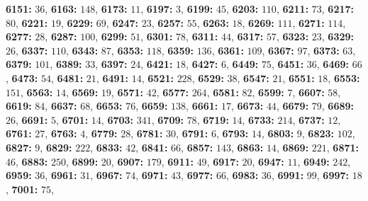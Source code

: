 \textsf{\bfseries 6151:} $36$, \textsf{\bfseries 6163:} $148$, \textsf{\bfseries 6173:} $11$, \textsf{\bfseries 6197:} $3$, \textsf{\bfseries 6199:} $45$, \textsf{\bfseries 6203:} $110$, \textsf{\bfseries 6211:} $73$, \textsf{\bfseries 6217:} $80$, \textsf{\bfseries 6221:} $19$, \textsf{\bfseries 6229:} $69$, \textsf{\bfseries 6247:} $23$, \textsf{\bfseries 6257:} $55$, \textsf{\bfseries 6263:} $18$, \textsf{\bfseries 6269:} $111$, \textsf{\bfseries 6271:} $114$, \textsf{\bfseries 6277:} $28$, \textsf{\bfseries 6287:} $100$, \textsf{\bfseries 6299:} $51$, \textsf{\bfseries 6301:} $78$, \textsf{\bfseries 6311:} $44$, \textsf{\bfseries 6317:} $57$, \textsf{\bfseries 6323:} $23$, \textsf{\bfseries 6329:} $26$, \textsf{\bfseries 6337:} $110$, \textsf{\bfseries 6343:} $87$, \textsf{\bfseries 6353:} $118$, \textsf{\bfseries 6359:} $136$, \textsf{\bfseries 6361:} $109$, \textsf{\bfseries 6367:} $97$, \textsf{\bfseries 6373:} $63$, \textsf{\bfseries 6379:} $101$, \textsf{\bfseries 6389:} $33$, \textsf{\bfseries 6397:} $24$, \textsf{\bfseries 6421:} $18$, \textsf{\bfseries 6427:} $6$, \textsf{\bfseries 6449:} $75$, \textsf{\bfseries 6451:} $36$, \textsf{\bfseries 6469:} $66$, \textsf{\bfseries 6473:} $54$, \textsf{\bfseries 6481:} $21$, \textsf{\bfseries 6491:} $14$, \textsf{\bfseries 6521:} $228$, \textsf{\bfseries 6529:} $38$, \textsf{\bfseries 6547:} $21$, \textsf{\bfseries 6551:} $18$, \textsf{\bfseries 6553:} $151$, \textsf{\bfseries 6563:} $14$, \textsf{\bfseries 6569:} $19$, \textsf{\bfseries 6571:} $42$, \textsf{\bfseries 6577:} $264$, \textsf{\bfseries 6581:} $82$, \textsf{\bfseries 6599:} $7$, \textsf{\bfseries 6607:} $58$, \textsf{\bfseries 6619:} $84$, \textsf{\bfseries 6637:} $68$, \textsf{\bfseries 6653:} $76$, \textsf{\bfseries 6659:} $138$, \textsf{\bfseries 6661:} $17$, \textsf{\bfseries 6673:} $44$, \textsf{\bfseries 6679:} $79$, \textsf{\bfseries 6689:} $26$, \textsf{\bfseries 6691:} $5$, \textsf{\bfseries 6701:} $14$, \textsf{\bfseries 6703:} $341$, \textsf{\bfseries 6709:} $78$, \textsf{\bfseries 6719:} $14$, \textsf{\bfseries 6733:} $214$, \textsf{\bfseries 6737:} $12$, \textsf{\bfseries 6761:} $27$, \textsf{\bfseries 6763:} $4$, \textsf{\bfseries 6779:} $28$, \textsf{\bfseries 6781:} $30$, \textsf{\bfseries 6791:} $6$, \textsf{\bfseries 6793:} $14$, \textsf{\bfseries 6803:} $9$, \textsf{\bfseries 6823:} $102$, \textsf{\bfseries 6827:} $9$, \textsf{\bfseries 6829:} $222$, \textsf{\bfseries 6833:} $42$, \textsf{\bfseries 6841:} $66$, \textsf{\bfseries 6857:} $143$, \textsf{\bfseries 6863:} $14$, \textsf{\bfseries 6869:} $221$, \textsf{\bfseries 6871:} $46$, \textsf{\bfseries 6883:} $250$, \textsf{\bfseries 6899:} $20$, \textsf{\bfseries 6907:} $179$, \textsf{\bfseries 6911:} $49$, \textsf{\bfseries 6917:} $20$, \textsf{\bfseries 6947:} $11$, \textsf{\bfseries 6949:} $242$, \textsf{\bfseries 6959:} $36$, \textsf{\bfseries 6961:} $31$, \textsf{\bfseries 6967:} $74$, \textsf{\bfseries 6971:} $43$, \textsf{\bfseries 6977:} $66$, \textsf{\bfseries 6983:} $36$, \textsf{\bfseries 6991:} $99$, \textsf{\bfseries 6997:} $18$, \textsf{\bfseries 7001:} $75$, 
